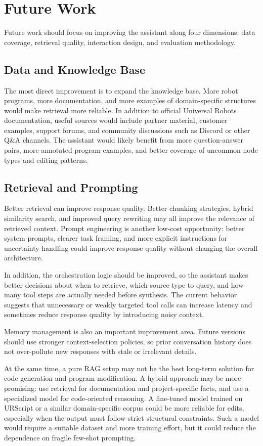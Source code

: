\section{Future Work} \label{sec:discussion:future-work}
Future work should focus on improving the assistant along four dimensions: data coverage, retrieval quality, interaction design, and evaluation methodology.

\subsection{Data and Knowledge Base}
The most direct improvement is to expand the knowledge base. More robot programs, more documentation, and more examples of domain-specific structures would make retrieval more reliable. In addition to official Universal Robots documentation, useful sources would include partner material, customer examples, support forums, and community discussions such as Discord or other Q\&A channels. The assistant would likely benefit from more question-answer pairs, more annotated program examples, and better coverage of uncommon node types and editing patterns.

\subsection{Retrieval and Prompting}
Better retrieval can improve response quality. Better chunking strategies, hybrid similarity search, and improved query rewriting may all improve the relevance of retrieved context. Prompt engineering is another low-cost opportunity: better system prompts, clearer task framing, and more explicit instructions for uncertainty handling could improve response quality without changing the overall architecture.

In addition, the orchestration logic should be improved, so the assistant makes better decisions about when to retrieve, which source type to query, and how many tool steps are actually needed before synthesis. The current behavior suggests that unnecessary or weakly targeted tool calls can increase latency and sometimes reduce response quality by introducing noisy context.

Memory management is also an important improvement area. Future versions should use stronger context-selection policies, so prior conversation history does not over-pollute new responses with stale or irrelevant details.

At the same time, a pure RAG setup may not be the best long-term solution for code generation and program modification. A hybrid approach may be more promising: use retrieval for documentation and project-specific facts, and use a specialized model for code-oriented reasoning. A fine-tuned model trained on URScript or a similar domain-specific corpus could be more reliable for edits, especially when the output must follow strict structural constraints. Such a model would require a suitable dataset and more training effort, but it could reduce the dependence on fragile few-shot prompting.

